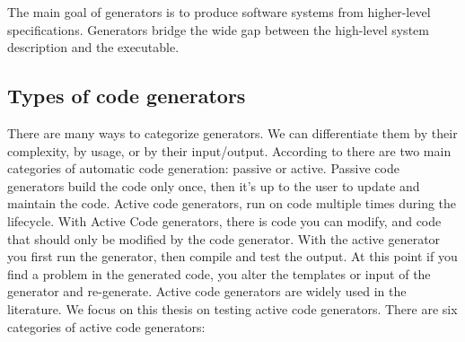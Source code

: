 The main goal of generators is to produce software systems from higher-level specifications. Generators bridge the wide gap between the high-level system description and the executable.
\subsection{Types of code generators}
There are many ways to categorize generators. We can differentiate them by their complexity, by usage, or by their input/output. According to\cite{herrington2003code} there are two main categories of automatic code generation: passive or active. Passive code generators build the code only once, then it’s up to the user to update and maintain the code.  Active code generators, run on code multiple times during the lifecycle.  With Active Code generators, there is code you can modify, and code that should only be modified by the code generator. With the active generator you first run the generator, then compile and test the output. At this point if you find a problem in the generated code, you alter the templates or input of the generator and re-generate. Active code generators are widely used in the literature. We focus on this thesis on testing active code generators.
There are six categories of active code generators: 

